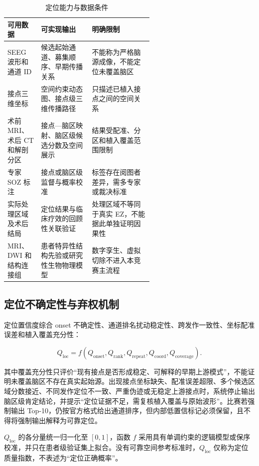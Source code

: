 \begin{table}[htbp]
    \centering
    \small
    \caption{定位能力与数据条件}
    \label{tab:space-levels}
    \renewcommand{\arraystretch}{1.25}
    \setlength{\tabcolsep}{3pt}
    \begin{tabularx}{\linewidth}{@{}p{0.23\linewidth}p{0.35\linewidth}X@{}}
        \toprule
        \textbf{可用数据} & \textbf{可实现输出} & \textbf{明确限制} \\
        \midrule
        SEEG 波形和通道 ID & 候选起始通道、募集顺序、早期传播关系 & 不能称为严格脑源成像，不能定位未覆盖脑区 \\
        接点三维坐标 & 空间约束动态图、接点级三维传播路径 & 只描述已植入接点之间的空间关系 \\
        术前 MRI、术后 CT 和解剖分区 & 接点—脑区映射、脑区级候选分数及空间展示 & 结果受配准、分区和植入覆盖范围限制 \\
        专家 SOZ 标注 & 接点或脑区级监督与概率校准 & 标签存在阅图者差异，需多专家或裁决标准 \\
        实际处理区域及术后结局 & 定位结果与临床疗效的回顾性关联验证 & 处理区域不等同于真实 EZ，不能据此单独证明因果性 \\
        MRI、DWI 和结构连接组 & 患者特异性结构先验或研究性生物物理模型 & 数字孪生、虚拟切除不进入本竞赛主流程 \\
        \bottomrule
    \end{tabularx}
\end{table}

\subsection{定位不确定性与弃权机制}

定位置信度综合 onset 不确定性、通道排名扰动稳定性、跨发作一致性、坐标配准误差和植入覆盖充分性：

$$
Q_{\mathrm{loc}}=
f(Q_{\mathrm{onset}},Q_{\mathrm{rank}},Q_{\mathrm{repeat}},
Q_{\mathrm{coord}},Q_{\mathrm{coverage}}).
$$

其中覆盖充分性只评价“现有接点是否形成稳定、可解释的早期上游模式”，不能证明未覆盖脑区不存在真实起始源。出现接点坐标缺失、配准误差超限、多个候选区域分数接近、不同发作定位不一致、严重伪迹或无稳定上游接点时，系统停止输出脑区级肯定结论，并提示“定位证据不足，需复核植入覆盖与原始波形”。比赛若强制输出 Top-10，仍按官方格式给出通道排序，但内部低置信标记必须保留，且不得将强制输出解释为可靠定位。

$Q_{\mathrm{loc}}$ 的各分量统一归一化至 $[0,1]$，函数 $f$ 采用具有单调约束的逻辑模型或保序校准，并只在患者级验证集上拟合。没有可靠空间参考标准时，$Q_{\mathrm{loc}}$ 仅称为定位质量指数，不表述为“定位正确概率”。

